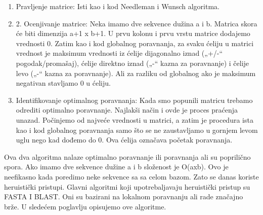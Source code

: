 \begin{enumerate}
\item Pravljenje matrice: Isti kao i kod Needleman i Wunsch algoritma.
\item 2. Ocenjivanje matrice: Neka imamo dve sekvence dužina a i b. Matrica skora će biti dimenzija a+1 x b+1. U prvu kolonu i prvu vrstu matrice dodajemo vrednosti 0. Zatim kao i kod globalnog poravnanja, za svaku ćeliju u matrici vrednost je maksimum vrednosti iz ćelije dijagonalno iznad („+/-“ pogodak/promašaj), ćelije direktno iznad („-“ kazna za poravnanje) i čelije levo („-“ kazna za poravnanje). Ali za razliku od globalnog ako je maksimum negativan stavljamo 0 u ćeliju.   
\item Identifikovanje optimalnog poravnanja: Kada smo popunili matricu trebamo odrediti optimalno poravnanje. Najlakši način i ovde je proces praćenja unazad. Počinjemo od najveće vrednosti u matrici, a zatim je procedura ista kao i kod globalnog poravnanja samo što se ne zaustavljamo u gornjem levom uglu nego kad dođemo do 0. Ova ćelija označava početak poravnanja.  

\end{enumerate} \vspace{5mm}

Ova dva algoritma nalaze optimalno poravnanje ili poravnanja ali su poprilično spora.  Ako imamo dve sekvence dužine a i b složenost je O(axb). Ovo je neefikasno kada poredimo neke sekvence sa sa celom bazom. Zato se danas koriste heruistički pristupi. Glavni algoritmi koji upotrebaljavaju heruistički pristup su FASTA I BLAST. Oni su bazirani na lokalnom poravnanju ali rade značajno brže. U sledećem poglavlju opisujemo ove algoritme.